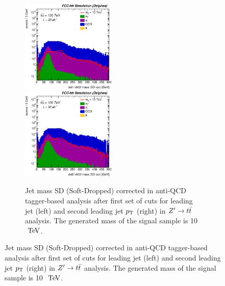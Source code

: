 \documentclass{cernrep}
\begin{document}
\begin{figure}[!htb]
\begin{figure}[!htb]\centering
\includegraphics[width=0.495\textwidth]{Fig/Zptt/Jet1_trk02_SD_Cor_m_sel3_nostack_log.eps}
\includegraphics[width=0.495\textwidth]{Fig/Zptt/Jet2_trk02_SD_Cor_m_sel3_nostack_log.eps}
\caption{Jet mass SD (Soft-Dropped) corrected in anti-QCD tagger-based analysis after first set of cuts for leading jet (left) and second leading jet $p\sb{\scriptstyle\mathrm{T}}$ (right) in $Z^{\prime} \rightarrow t\bar{t}$ analysis. The generated mass of the signal sample is 10 $\TeV$.}
\label{fig:RSGww_sel1_tagger}
\end{figure}


\end{figure}
\end{document}
